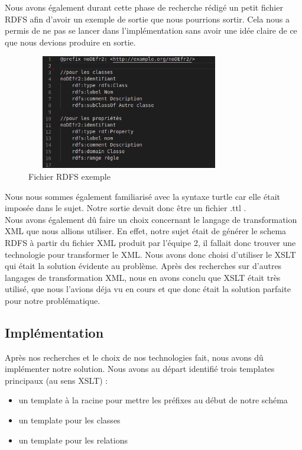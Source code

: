 \documentclass{article}
\begin{document}
Nous avons également durant cette phase de recherche rédigé un petit fichier RDFS afin d'avoir un exemple de sortie que nous pourrions sortir.  Cela nous a permis de ne pas se lancer dans l'implémentation sans avoir une idée claire de ce que nous devions produire en sortie.\\

\begin{figure}[!ht]
    \center
    \includegraphics[width=9cm, height=5cm]{img/schema_ex}
    \caption{Fichier RDFS exemple}
\end{figure}

Nous nous sommes également familiarisé avec la syntaxe turtle car elle était imposée dans le sujet. Notre sortie devait donc être un fichier .ttl .\\

Nous avons également dû faire un choix concernant le langage de transformation XML que nous allions utiliser. En effet, notre sujet était de générer le schema RDFS à partir du fichier XML produit par l'équipe 2, il fallait donc trouver une technologie pour transformer le XML. Nous avons donc choisi d'utiliser le XSLT qui était la solution évidente au problème. Après des recherches sur d'autres langages de transformation XML, nous en avons conclu que XSLT était très utilisé, que nous l'avions déja vu en cours et que donc était la solution parfaite pour notre problématique.

\subsection{Implémentation}

Après nos recherches et le choix de nos technologies fait, nous avons dû implémenter notre solution.
Nous avons au départ identifié trois templates principaux (au sens XSLT) :
\begin{itemize} 
\item{un template à la racine pour mettre les préfixes au début de notre schéma}
\item{un template pour les classes}
\item{un template pour les relations}
\end{itemize}
\end{document}
